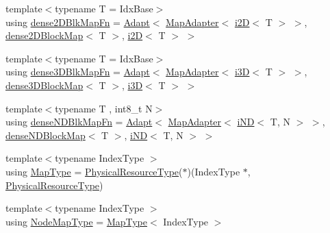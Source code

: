 \begin{DoxyCompactItemize}
\item 
{\footnotesize template$<$typename T  = Idx\+Base$>$ }\\using \hyperlink{namespacevt_1_1mapping_a528ef51db9f74e1bb6258a161b329873}{dense2\+D\+Blk\+Map\+Fn} = \hyperlink{namespacevt_1_1mapping_aafe187035ce8df02f31983e37cdb6a5d}{Adapt}$<$ \hyperlink{namespacevt_1_1mapping_a41b113c28bb6430fbcb5be66e08ccf9f}{Map\+Adapter}$<$ \hyperlink{namespacevt_1_1mapping_a6448c875e0807b43f31e96fc5b0cec04}{i2D}$<$ T $>$ $>$, \hyperlink{namespacevt_1_1mapping_aca20bcd20c24f4a43e217ca63bf5812c}{dense2\+D\+Block\+Map}$<$ T $>$, \hyperlink{namespacevt_1_1mapping_a6448c875e0807b43f31e96fc5b0cec04}{i2D}$<$ T $>$ $>$
\item 
{\footnotesize template$<$typename T  = Idx\+Base$>$ }\\using \hyperlink{namespacevt_1_1mapping_a20b151291c38fe5008608b65f28759ac}{dense3\+D\+Blk\+Map\+Fn} = \hyperlink{namespacevt_1_1mapping_aafe187035ce8df02f31983e37cdb6a5d}{Adapt}$<$ \hyperlink{namespacevt_1_1mapping_a41b113c28bb6430fbcb5be66e08ccf9f}{Map\+Adapter}$<$ \hyperlink{namespacevt_1_1mapping_af435b967b9ed1ccb5ec4effdbd9abd13}{i3D}$<$ T $>$ $>$, \hyperlink{namespacevt_1_1mapping_a91764d84e5e6d8253872740cb8424726}{dense3\+D\+Block\+Map}$<$ T $>$, \hyperlink{namespacevt_1_1mapping_af435b967b9ed1ccb5ec4effdbd9abd13}{i3D}$<$ T $>$ $>$
\item 
{\footnotesize template$<$typename T , int8\+\_\+t N$>$ }\\using \hyperlink{namespacevt_1_1mapping_add8e2f407f58eb99d2cadc0cc2801e7a}{dense\+N\+D\+Blk\+Map\+Fn} = \hyperlink{namespacevt_1_1mapping_aafe187035ce8df02f31983e37cdb6a5d}{Adapt}$<$ \hyperlink{namespacevt_1_1mapping_a41b113c28bb6430fbcb5be66e08ccf9f}{Map\+Adapter}$<$ \hyperlink{namespacevt_1_1mapping_ad53b53dc14e67437c17cefe9c3c70380}{i\+ND}$<$ T, N $>$ $>$, \hyperlink{namespacevt_1_1mapping_a8e5581179e571387304de4b1d19640e7}{dense\+N\+D\+Block\+Map}$<$ T $>$, \hyperlink{namespacevt_1_1mapping_ad53b53dc14e67437c17cefe9c3c70380}{i\+ND}$<$ T, N $>$ $>$
\item 
{\footnotesize template$<$typename Index\+Type $>$ }\\using \hyperlink{namespacevt_1_1mapping_a443f8bb8920af5ae1d3391f61fe492a6}{Map\+Type} = \hyperlink{namespacevt_a2dc36fcada816dc6d11774d650328ee9}{Physical\+Resource\+Type}($\ast$)(Index\+Type $\ast$, \hyperlink{namespacevt_a2dc36fcada816dc6d11774d650328ee9}{Physical\+Resource\+Type})
\item 
{\footnotesize template$<$typename Index\+Type $>$ }\\using \hyperlink{namespacevt_1_1mapping_a8dbe779cb3e28ed8c424bcc8826765b9}{Node\+Map\+Type} = \hyperlink{namespacevt_1_1mapping_a443f8bb8920af5ae1d3391f61fe492a6}{Map\+Type}$<$ Index\+Type $>$

\end{DoxyCompactItemize}
